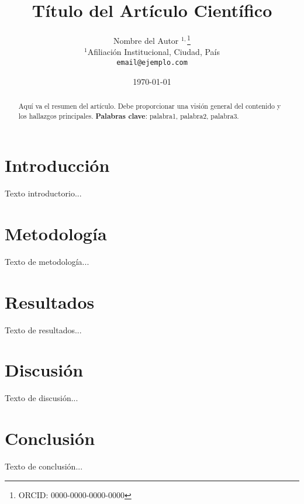\documentclass[a4paper,12pt]{article}
\title{\textbf{Título del Artículo Científico}}
\author{
    Nombre del Autor $^{1,}$\footnote{ORCID: 0000-0000-0000-0000} \\
    \small $^1$Afiliación Institucional, Ciudad, País \\
    \small \texttt{email@ejemplo.com}
}
\date{\today}
\begin{document}
\maketitle

\begin{abstract}
    Aquí va el resumen del artículo. Debe proporcionar una visión general del contenido y los hallazgos principales.
    \textbf{Palabras clave}: palabra1, palabra2, palabra3.
\end{abstract}

\section{Introducción}
Texto introductorio...

\section{Metodología}
Texto de metodología...

\section{Resultados}
Texto de resultados...

\section{Discusión}
Texto de discusión...

\section{Conclusión}
Texto de conclusión...


\end{document}
